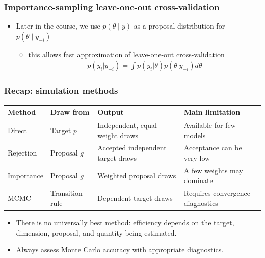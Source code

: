 \documentclass[10pt]{beamer}
\begin{document}
\begin{frame}

\frametitle{Importance-sampling leave-one-out cross-validation}

  \begin{itemize}
  \item Later in the course, we use $p(\theta\mid y)$ as a proposal
    distribution for $p(\theta\mid y_{-i})$
    \begin{itemize}
    \item this allows fast approximation of leave-one-out cross-validation
      \begin{align*}
        p(y_i|y_{-i})=\int p(y_i|\theta) p(\theta|y_{-i}) d\theta
      \end{align*}
    \end{itemize}
  \end{itemize}

\end{frame}

%
%
%

\begin{frame}
\frametitle{Recap: simulation methods}

{\small
\begin{tabular}{@{}p{1.7cm}p{1.8cm}p{2.2cm}p{2.7cm}@{}}
\textbf{Method} & \textbf{Draw from} & \textbf{Output} & \textbf{Main limitation} \\
\hline
Direct & Target $p$ & Independent, equal-weight draws & Available for few models \\[1mm]
Rejection & Proposal $g$ & Accepted independent target draws & Acceptance can be very low \\[1mm]
Importance & Proposal $g$ & Weighted proposal draws & A few weights may dominate \\[1mm]
MCMC & Transition rule & Dependent target draws & Requires convergence diagnostics
\end{tabular}
}

\pause
\vspace{0.8\baselineskip}
\begin{itemize}
  \item There is no universally best method: efficiency depends on the
    target, dimension, proposal, and quantity being estimated.
  \item Always assess Monte Carlo accuracy with appropriate diagnostics.
\end{itemize}

\end{frame}
\end{document}

